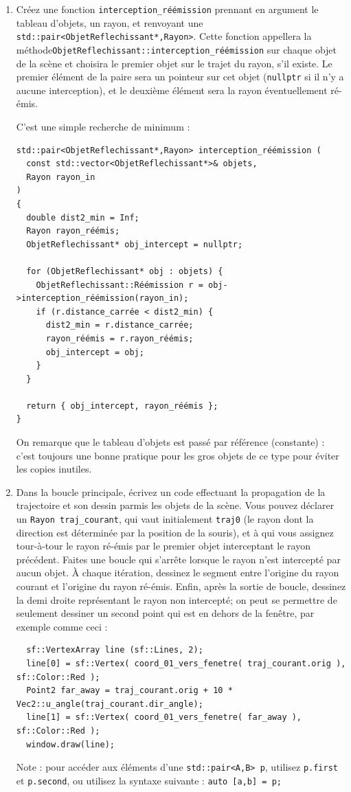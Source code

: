 \documentclass{book}
\newcommand{\inline}[1]{\texttt{#1}}
\begin{document}
\begin{enumerate}
  \item Créez une fonction \inline{interception_réémission} prennant en argument le tableau d'objets, un rayon, et renvoyant une \inline{std::pair<ObjetReflechissant*,Rayon>}. Cette fonction appellera la méthode\linebreak\inline{ObjetReflechissant::interception_réémission} sur chaque objet de la scène et choisira le premier objet sur le trajet du rayon, s'il existe. Le premier élément de la paire sera un pointeur sur cet objet (\inline{nullptr} si il n'y a aucune interception), et le deuxième élément sera la rayon éventuellement ré-émis.

\begin{correction}
C'est une simple recherche de minimum :
\begin{verbatim}
std::pair<ObjetReflechissant*,Rayon> interception_réémission (
  const std::vector<ObjetReflechissant*>& objets,
  Rayon rayon_in
)
{
  double dist2_min = Inf;
  Rayon rayon_réémis;
  ObjetReflechissant* obj_intercept = nullptr;
  
  for (ObjetReflechissant* obj : objets) {
    ObjetReflechissant::Réémission r = obj->interception_réémission(rayon_in);
    if (r.distance_carrée < dist2_min) {
      dist2_min = r.distance_carrée;
      rayon_réémis = r.rayon_réémis;
      obj_intercept = obj;
    }
  }

  return { obj_intercept, rayon_réémis };
}
\end{verbatim}
On remarque que le tableau d'objets est passé par référence (constante) : c'est toujours une bonne pratique pour les gros objets de ce type pour éviter les copies inutiles.
\end{correction}

  \item Dans la boucle principale, écrivez un code effectuant la propagation de la trajectoire et son dessin parmis les objets de la scène. Vous pouvez déclarer un \inline{Rayon traj_courant}, qui vaut initialement \inline{traj0} (le rayon dont la direction est déterminée par la position de la souris), et à qui vous assignez tour-à-tour le rayon ré-émis par le premier objet interceptant le rayon précédent. Faites une boucle qui s'arrête lorsque le rayon n'est intercepté par aucun objet. À chaque itération, dessinez le segment entre l'origine du rayon courant et l'origine du rayon ré-émis. Enfin, après la sortie de boucle, dessinez la demi droite représentant le rayon non intercepté; on peut se permettre de seulement dessiner un second point qui est en dehors de la fenêtre, par exemple comme ceci :
  \begin{verbatim}
  sf::VertexArray line (sf::Lines, 2);
  line[0] = sf::Vertex( coord_01_vers_fenetre( traj_courant.orig ), sf::Color::Red );
  Point2 far_away = traj_courant.orig + 10 * Vec2::u_angle(traj_courant.dir_angle);
  line[1] = sf::Vertex( coord_01_vers_fenetre( far_away ), sf::Color::Red );
  window.draw(line);
  \end{verbatim}
  Note : pour accéder aux éléments d'une \inline{std::pair<A,B> p}, utilisez \inline{p.first} et \inline{p.second}, ou utilisez la syntaxe suivante : \inline{auto [a,b] = p;}


\end{enumerate}
\end{document}
